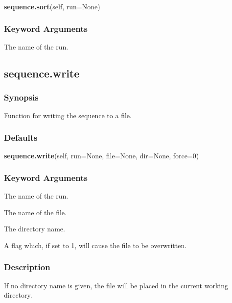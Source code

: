 \textsf{\textbf{sequence.sort}(self, run=None)}


\subsubsection{Keyword Arguments}

  The name of the run. 





\newpage

\subsection{sequence.write}


\subsubsection{Synopsis}

Function for writing the sequence to a file.



\subsubsection{Defaults}

\textsf{\textbf{sequence.write}(self, run=None, file=None, dir=None, force=0)}


\subsubsection{Keyword Arguments}

  The name of the run. 

  The name of the file. 

  The directory name. 

  A flag which, if set to 1, will cause the file to be overwritten. 




\subsubsection{Description}

If no directory name is given, the file will be placed in the current working directory.




\newpage

